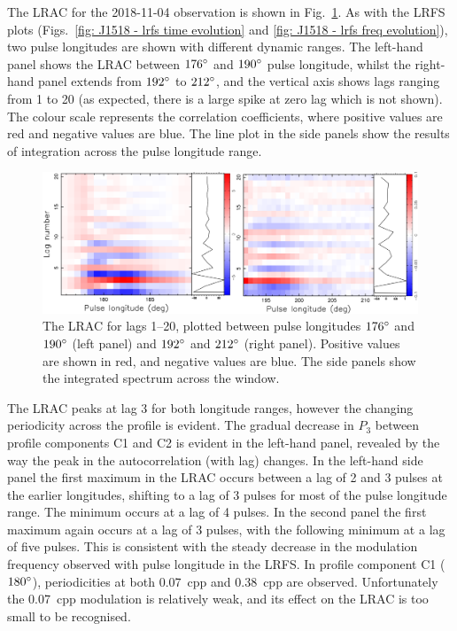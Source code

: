 The LRAC for the 2018-11-04 observation is shown in Fig.~\ref{fig: J1518 - LRAC}. As with the LRFS plots (Figs.~\ref{fig: J1518 - lrfs time evolution} and \ref{fig: J1518 - lrfs freq evolution}), two pulse longitudes are shown with different dynamic ranges. The left-hand panel shows the LRAC between $176^\circ$ and $190^\circ$ pulse longitude, whilst the right-hand panel extends from $192^\circ$ to $212^\circ$, and the vertical axis shows lags ranging from 1 to 20 (as expected, there is a large spike at zero lag which is not shown). The colour scale represents the correlation coefficients, where positive values are red and negative values are blue. The line plot in the side panels show the results of integration across the pulse longitude range. 
\begin{figure}
    \begin{center}
        \includegraphics[width=\textwidth]{Figures/J1518/LRAC}
        \caption[The longitude-resolved autocorrelation spectrum]{The LRAC for lags 1--20, plotted between pulse longitudes $176^\circ$ and $190^\circ$ (left panel) and $192^\circ$ and $212^\circ$ (right panel). Positive values are shown in red, and negative values are blue. The side panels show the integrated spectrum across the window.}
        \label{fig: J1518 - LRAC}
    \end{center}
\end{figure}
The LRAC peaks at lag 3 for both longitude ranges, however the changing periodicity across the profile is evident. The gradual decrease in $P_3$ between profile components C1 and C2 is evident in the left-hand panel, revealed by the way the peak in the autocorrelation (with lag) changes. In the left-hand side panel the first maximum in the LRAC occurs between a lag of 2 and 3 pulses at the earlier longitudes, shifting to a lag of 3 pulses for most of the pulse longitude range. The minimum occurs at a lag of 4 pulses. In the second panel the first maximum again occurs at a lag of 3 pulses, with the following minimum at a lag of five pulses. This is consistent with the steady decrease in the modulation frequency observed with pulse longitude in the LRFS. In profile component C1 ($180^\circ$), periodicities at both 0.07~cpp and 0.38~cpp are observed. Unfortunately the 0.07~cpp modulation is relatively weak, and its effect on the LRAC is too small to be recognised.

